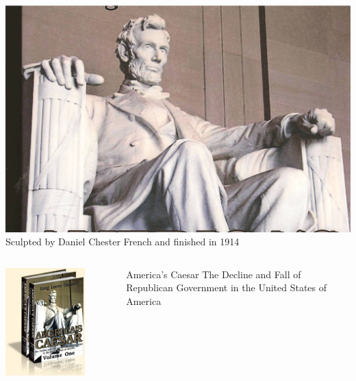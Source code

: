 \begin{frame}
    \centering
    \includegraphics[width=.9\textwidth]{img/lincoln-memorial.jpg} \\
    Sculpted by Daniel Chester French and finished in 1914\\
\end{frame}

\begin{frame}
    \begin{columns}[onlytextwidth]
            \centering
            \includegraphics[width=0.75\textwidth]{img/americas-caesar.png} \\

            \begin{block}{America's Caesar}
                The Decline and Fall of Republican Government in the United States of America
            \end{block}
    \end{columns}
\end{frame}

